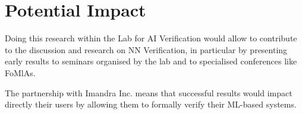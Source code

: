 \documentclass[]{article}
\begin{document}
\section{Potential Impact}
Doing this research within the Lab for AI Verification would allow to contribute to the discussion and research on NN Verification, in particular by presenting early results to seminars organised by the lab and to specialised conferences like FoMlAs.

The partnership with Imandra Inc. means that successful results would impact directly their users by allowing them to formally verify their ML-based systems.
\end{document}
